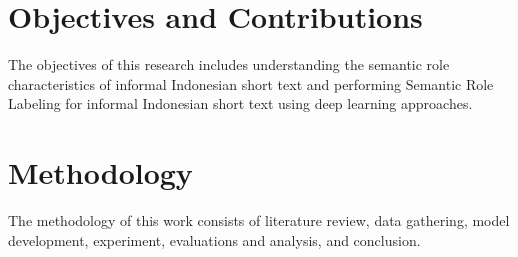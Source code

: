 \section{Objectives and Contributions}
The objectives of this research includes understanding the semantic role characteristics of informal Indonesian short text and performing Semantic Role Labeling for informal Indonesian short text using deep learning approaches.

\section{Methodology}
The methodology of this work consists of literature review, data gathering, model development, experiment, evaluations and analysis, and conclusion.

